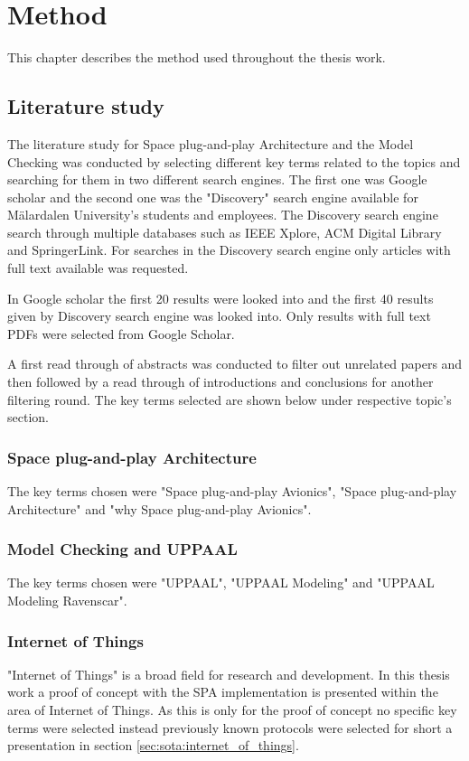 \chapter{Method}\label{ch:method}
This chapter describes the method used throughout the thesis work.

\section{Literature study}
The literature study for Space plug-and-play Architecture and the Model
Checking was conducted by selecting different key terms related to the topics
and searching for them in two different search engines. The first one was
Google scholar and the second one was the "Discovery" search engine available
for M\"{a}lardalen University's students and employees. The Discovery search engine
search through multiple databases such as IEEE Xplore, ACM Digital Library and
SpringerLink. For searches in the Discovery search engine only articles with
full text available was requested.

In Google scholar the first 20 results were looked into and the first 40
results given by Discovery search engine was looked into. Only results with
full text PDFs were selected from Google Scholar.

A first read through of abstracts was conducted to filter out unrelated
papers and then followed by a read through of introductions and conclusions for
another filtering round. The key terms selected are shown below under
respective topic's section.

\subsection{Space plug-and-play Architecture}
The key terms chosen were "Space plug-and-play Avionics", "Space
plug-and-play Architecture" and "why Space plug-and-play Avionics".

\subsection{Model Checking and UPPAAL}
The key terms chosen were "UPPAAL", "UPPAAL Modeling" and "UPPAAL Modeling
Ravenscar".

\subsection{Internet of Things}
"Internet of Things" is a broad field for research and development. In
this thesis work a proof of concept with the SPA implementation is
presented within the area of Internet of Things. As this is only for the proof
of concept no specific key terms were selected instead previously known
protocols were selected for short a presentation in section
\ref{sec:sota:internet_of_things}.

